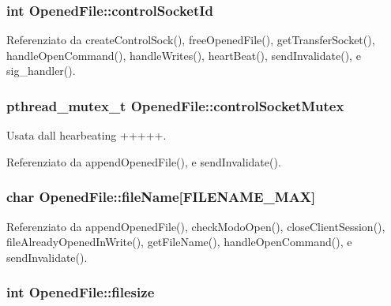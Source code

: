 \subsubsection[{\texorpdfstring{control\+Socket\+Id}{controlSocketId}}]{\setlength{\rightskip}{0pt plus 5cm}int Opened\+File\+::control\+Socket\+Id}\hypertarget{structOpenedFile_a591b34fa52d94c831734d7cead0c6630}{}\label{structOpenedFile_a591b34fa52d94c831734d7cead0c6630}


Referenziato da create\+Control\+Sock(), free\+Opened\+File(), get\+Transfer\+Socket(), handle\+Open\+Command(), handle\+Writes(), heart\+Beat(), send\+Invalidate(), e sig\+\_\+handler().

\subsubsection[{\texorpdfstring{control\+Socket\+Mutex}{controlSocketMutex}}]{\setlength{\rightskip}{0pt plus 5cm}pthread\+\_\+mutex\+\_\+t Opened\+File\+::control\+Socket\+Mutex}\hypertarget{structOpenedFile_a59d8fd7142cc9f6a40828160a0f5fc08}{}\label{structOpenedFile_a59d8fd7142cc9f6a40828160a0f5fc08}


Usata dall\textquotesingle{} hearbeating +++++. 



Referenziato da append\+Opened\+File(), e send\+Invalidate().

\subsubsection[{\texorpdfstring{file\+Name}{fileName}}]{\setlength{\rightskip}{0pt plus 5cm}char Opened\+File\+::file\+Name\mbox{[}F\+I\+L\+E\+N\+A\+M\+E\+\_\+\+M\+AX\mbox{]}}\hypertarget{structOpenedFile_a060ea540c44e9570b59a0e2297e9d47b}{}\label{structOpenedFile_a060ea540c44e9570b59a0e2297e9d47b}


Referenziato da append\+Opened\+File(), check\+Modo\+Open(), close\+Client\+Session(), file\+Already\+Opened\+In\+Write(), get\+File\+Name(), handle\+Open\+Command(), e send\+Invalidate().

\subsubsection[{\texorpdfstring{filesize}{filesize}}]{\setlength{\rightskip}{0pt plus 5cm}int Opened\+File\+::filesize}\hypertarget{structOpenedFile_a3b2e157f5aad06b65bd017d67fde4eb3}{}\label{structOpenedFile_a3b2e157f5aad06b65bd017d67fde4eb3}


